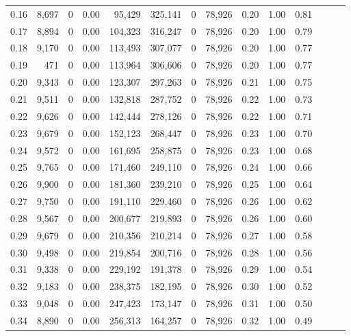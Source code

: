 \begin{tabular}{rrrrrrrrrrrrrr}
0.16 &  8,697 &      0 &  0.00 &   95,429 &  325,141 &       0 &  78,926 &  0.20 &  1.00 &      0.81 \\
0.17 &  8,894 &      0 &  0.00 &  104,323 &  316,247 &       0 &  78,926 &  0.20 &  1.00 &      0.79 \\
0.18 &  9,170 &      0 &  0.00 &  113,493 &  307,077 &       0 &  78,926 &  0.20 &  1.00 &      0.77 \\
0.19 &    471 &      0 &  0.00 &  113,964 &  306,606 &       0 &  78,926 &  0.20 &  1.00 &      0.77 \\
0.20 &  9,343 &      0 &  0.00 &  123,307 &  297,263 &       0 &  78,926 &  0.21 &  1.00 &      0.75 \\
0.21 &  9,511 &      0 &  0.00 &  132,818 &  287,752 &       0 &  78,926 &  0.22 &  1.00 &      0.73 \\
0.22 &  9,626 &      0 &  0.00 &  142,444 &  278,126 &       0 &  78,926 &  0.22 &  1.00 &      0.71 \\
0.23 &  9,679 &      0 &  0.00 &  152,123 &  268,447 &       0 &  78,926 &  0.23 &  1.00 &      0.70 \\
0.24 &  9,572 &      0 &  0.00 &  161,695 &  258,875 &       0 &  78,926 &  0.23 &  1.00 &      0.68 \\
0.25 &  9,765 &      0 &  0.00 &  171,460 &  249,110 &       0 &  78,926 &  0.24 &  1.00 &      0.66 \\
0.26 &  9,900 &      0 &  0.00 &  181,360 &  239,210 &       0 &  78,926 &  0.25 &  1.00 &      0.64 \\
0.27 &  9,750 &      0 &  0.00 &  191,110 &  229,460 &       0 &  78,926 &  0.26 &  1.00 &      0.62 \\
0.28 &  9,567 &      0 &  0.00 &  200,677 &  219,893 &       0 &  78,926 &  0.26 &  1.00 &      0.60 \\
0.29 &  9,679 &      0 &  0.00 &  210,356 &  210,214 &       0 &  78,926 &  0.27 &  1.00 &      0.58 \\
0.30 &  9,498 &      0 &  0.00 &  219,854 &  200,716 &       0 &  78,926 &  0.28 &  1.00 &      0.56 \\
0.31 &  9,338 &      0 &  0.00 &  229,192 &  191,378 &       0 &  78,926 &  0.29 &  1.00 &      0.54 \\
0.32 &  9,183 &      0 &  0.00 &  238,375 &  182,195 &       0 &  78,926 &  0.30 &  1.00 &      0.52 \\
0.33 &  9,048 &      0 &  0.00 &  247,423 &  173,147 &       0 &  78,926 &  0.31 &  1.00 &      0.50 \\
0.34 &  8,890 &      0 &  0.00 &  256,313 &  164,257 &       0 &  78,926 &  0.32 &  1.00 &      0.49 \\

\end{tabular}
